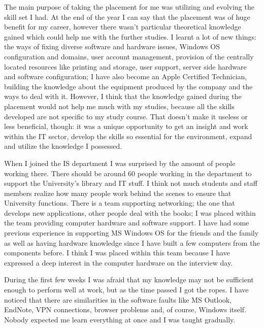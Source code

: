 \documentclass[10pt,a4paper,headinclude=true]{report}
\begin{document}
The main purpose of taking the placement for me was utilizing and evolving the skill set I had. At the end of the year I can say that the placement was of huge benefit for my career, however there wasn't particular theoretical knowledge gained which could help me with the further studies. I learnt a lot of new things: the ways of fixing diverse software and hardware issues, Windows OS configuration and domains, user account management, provision of the centrally located resources like printing and storage, user support, server side hardware and software configuration; I have also become an Apple Certified Technician, building the knowledge about the equipment produced by the company and the ways to deal with it. However, I think that the knowledge gained during the placement would not help me much with my studies, because all the skills developed are not specific to my study course. That doesn't make it useless or less beneficial, though: it was a unique opportunity to get an insight and work within the IT sector, develop the skills so essential for the environment, expand and utilize the knowledge I possessed.

When I joined the IS department I was surprised by the amount of people working there. There should be around 60 people working in the department to support the University's library and IT stuff. I think not much students and staff members realize how many people work behind the scenes to ensure that University functions. There is a team supporting networking; the one that develops new applications, other people deal with the books; I was placed within the team providing computer hardware and software support. I have had some previous experience in supporting MS Windows OS for the friends and the family as well as having hardware knowledge since I have built a few computers from the components before. I think I was placed within this team because I have expressed a deep interest in the computer hardware on the interview day.

During the first few weeks I was afraid that my knowledge may not be sufficient enough to perform well at work, but as the time passed I got the ropes. I have noticed that there are similarities in the software faults like MS Outlook, EndNote, VPN connections, browser problems and, of course, Windows itself. Nobody expected me learn everything at once and I was taught gradually.
\end{document}
